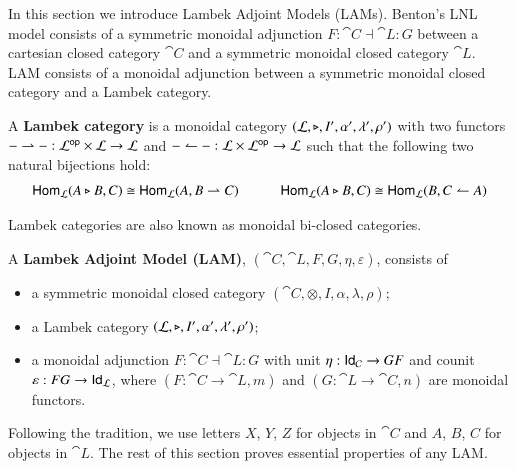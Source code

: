 In this section we introduce Lambek Adjoint Models (LAMs). Benton's
LNL model consists of a symmetric monoidal adjunction
$F:\cat{C}\dashv\cat{L}:G$ between a cartesian closed category
$\cat{C}$ and a symmetric monoidal closed category $\cat{L}$. LAM
consists of a monoidal adjunction between a symmetric monoidal closed
category and a Lambek category.
\begin{definition}
  \label{def:lambek-category}
  A \textbf{Lambek category} is a monoidal category $(\mathcal{L},\triangleright,I',\alpha',\lambda',\rho')$
  with two functors $- \rightharpoonup - : \mathcal{L}^{\mathsf{op}} \times \mathcal{L} \rightarrow \mathcal{L}$ and
  $- \leftharpoonup - : \mathcal{L} \times \mathcal{L}^{\mathsf{op}} \rightarrow \mathcal{L}$ such that the following
  two natural bijections hold:
  \[
  \begin{array}{lllll}
    \mathsf{Hom}_{\mathcal{L}}(A \triangleright B,C) \cong \mathsf{Hom}_{\mathcal{L}}(A,B \rightharpoonup C) & \quad &
    \mathsf{Hom}_{\mathcal{L}}(A \triangleright B,C) \cong \mathsf{Hom}_{\mathcal{L}}(B,C \leftharpoonup A)\\
  \end{array}
  \]  
\end{definition}
\noindent
Lambek categories are also known as monoidal bi-closed categories.

\begin{definition}
  A \textbf{Lambek Adjoint Model (LAM)}, $(\cat{C},\cat{L},F,G,\eta,\varepsilon)$, consists of
  \begin{itemize}
  \item a symmetric monoidal closed category $(\cat{C},\otimes,I,\alpha,\lambda,\rho)$;
  \item a Lambek category $(\mathcal{L},\triangleright,I',\alpha',\lambda',\rho')$;
  \item a monoidal adjunction $F:\cat{C}\dashv\cat{L}:G$ with unit $\eta:\mathsf{Id}_{\mathcal{C}} \rightarrow GF$ and
        counit $\varepsilon:FG\rightarrow \mathsf{Id}_{\mathcal{L}}$, where $(F:\cat{C}\rightarrow\cat{L}, m)$
        and $(G:\cat{L}\rightarrow\cat{C}, n)$ are monoidal functors.
  \end{itemize}
\end{definition}
\noindent
Following the tradition, we use letters $X$, $Y$, $Z$ for objects in
$\cat{C}$ and $A$, $B$, $C$ for objects in $\cat{L}$. The rest of this
section proves essential properties of any LAM.

